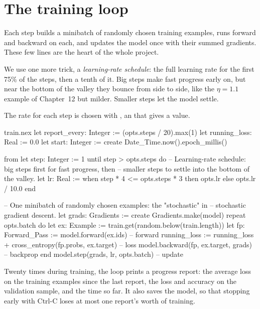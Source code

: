 \documentclass[11pt,a4paper,oneside,openany]{book}
\newcommand{\code}[1]{\texttt{\detokenize{#1}}}
\begin{document}
\section{The training loop}

Each step builds a minibatch of randomly chosen training examples, runs
forward and backward on each, and updates the model once with their
summed gradients. These few lines are the heart of the whole project.

We use one more trick, a \emph{learning-rate schedule}: the full learning
rate for the first 75\% of the steps, then a tenth of it. Big steps make
fast progress early on, but near the bottom of the valley they bounce from
side to side, like the $\eta = 1.1$ example of Chapter~12 but milder.
Smaller steps let the model settle.

The rate for each step is chosen with \code{when ... then ... else ...
end}, an \code{if} that gives a value.

\begin{continued}{train.nex}
  let report_every: Integer := (opts.steps / 20).max(1)
  let running_loss: Real := 0.0
  let start: Integer := create Date_Time.now().epoch_millis()

  from
    let step: Integer := 1
  until
    step > opts.steps
  do
    -- Learning-rate schedule: big steps first for fast progress, then
    -- smaller steps to settle into the bottom of the valley.
    let lr: Real := when step * 4 <= opts.steps * 3 then opts.lr else opts.lr / 10.0 end

    -- One minibatch of randomly chosen examples: the "stochastic" in
    -- stochastic gradient descent.
    let grads: Gradients := create Gradients.make(model)
    repeat opts.batch do
      let ex: Example := train.get(random.below(train.length))
      let fp: Forward_Pass := model.forward(ex.ids)                     -- forward
      running_loss := running_loss + cross_entropy(fp.probs, ex.target) -- loss
      model.backward(fp, ex.target, grads)                              -- backprop
    end
    model.step(grads, lr, opts.batch)                                   -- update
\end{continued}

Twenty times during training, the loop prints a progress report: the
average loss on the training examples since the last report, the loss and
accuracy on the validation sample, and the time so far. It also saves the
model, so that stopping early with Ctrl-C loses at most one report's
worth of training.
\end{document}
